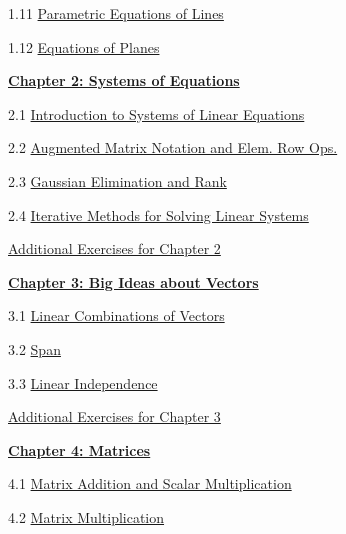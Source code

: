 \documentclass{ximera}
\begin{document}
1.11	\href{https://ximera.osu.edu/linearalgebradzv3/LinearAlgebraInteractiveIntro/RRN-0020/main}{Parametric Equations of Lines}
	
1.12	\href{https://ximera.osu.edu/linearalgebradzv3/LinearAlgebraInteractiveIntro/RRN-0030/main}{Equations of Planes}
	
\href{https://ximera.osu.edu/linearalgebradzv3/LinearAlgebraInteractiveIntro/XLAChapter_systems/main}{\textbf{Chapter 2: Systems of Equations}}
	
2.1	\href{https://ximera.osu.edu/linearalgebradzv3/LinearAlgebraInteractiveIntro/SYS-0020/main}{Introduction to Systems of Linear Equations}
	
2.2	\href{https://ximera.osu.edu/linearalgebradzv3/LinearAlgebraInteractiveIntro/SYS-0030/main}{Augmented Matrix Notation and Elem. Row Ops.}
	
2.3	\href{https://ximera.osu.edu/linearalgebradzv3/LinearAlgebraInteractiveIntro/SYS-0030/main}{Gaussian Elimination and Rank}
	
2.4	\href{https://ximera.osu.edu/linearalgebradzv3/LinearAlgebraInteractiveIntro/SYS-0040/main}{Iterative Methods for Solving Linear Systems}
	
\href{https://ximera.osu.edu/linearalgebradzv3/LinearAlgebraInteractiveIntro/SUPX-0020/main}{Additional Exercises for Chapter 2}
	
\href{https://ximera.osu.edu/linearalgebradzv3/LinearAlgebraInteractiveIntro/XLAChapter_bigIdeas/main}{\textbf{Chapter 3: Big Ideas about Vectors}}
	
3.1	\href{https://ximera.osu.edu/linearalgebradzv3/LinearAlgebraInteractiveIntro/VEC-0040/main}{Linear Combinations of Vectors}
	
3.2	\href{https://ximera.osu.edu/linearalgebradzv3/LinearAlgebraInteractiveIntro/VEC-0090/main}{Span}
	
3.3	\href{https://ximera.osu.edu/linearalgebradzv3/LinearAlgebraInteractiveIntro/VEC-0100/main}{Linear Independence}
	
\href{https://ximera.osu.edu/linearalgebradzv3/LinearAlgebraInteractiveIntro/SUPX-0030/main}{Additional Exercises for Chapter 3}
	
\href{https://ximera.osu.edu/linearalgebradzv3/LinearAlgebraInteractiveIntro/XLAChapter_matrices/main}{\textbf{Chapter 4: Matrices}}
	
4.1	\href{https://ximera.osu.edu/linearalgebradzv3/LinearAlgebraInteractiveIntro/MAT-0010/main}{Matrix Addition and Scalar Multiplication}
	
4.2	\href{https://ximera.osu.edu/linearalgebradzv3/LinearAlgebraInteractiveIntro/MAT-0020/main}{Matrix Multiplication}
	
\end{document}
